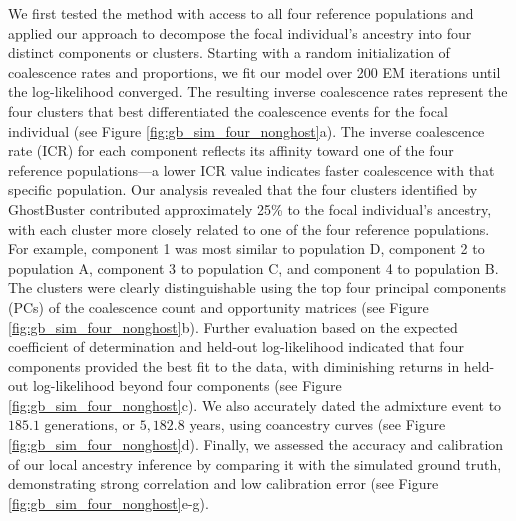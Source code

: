 We first tested the method with access to all four reference populations and applied our approach to decompose the focal individual's ancestry into four distinct components or clusters. Starting with a random initialization of coalescence rates and proportions, we fit our model over 200 EM iterations until the log-likelihood converged. The resulting inverse coalescence rates represent the four clusters that best differentiated the coalescence events for the focal individual (see Figure \ref{fig:gb_sim_four_nonghost}a). The inverse coalescence rate (ICR) for each component reflects its affinity toward one of the four reference populations—a lower ICR value indicates faster coalescence with that specific population. Our analysis revealed that the four clusters identified by GhostBuster contributed approximately 25\% to the focal individual's ancestry, with each cluster more closely related to one of the four reference populations. For example, component 1 was most similar to population D, component 2 to population A, component 3 to population C, and component 4 to population B. The clusters were clearly distinguishable using the top four principal components (PCs) of the coalescence count and opportunity matrices (see Figure \ref{fig:gb_sim_four_nonghost}b). Further evaluation based on the expected coefficient of determination and held-out log-likelihood indicated that four components provided the best fit to the data, with diminishing returns in held-out log-likelihood beyond four components (see Figure \ref{fig:gb_sim_four_nonghost}c). We also accurately dated the admixture event to $185.1$ generations, or $5{,}182.8$ years, using coancestry curves (see Figure \ref{fig:gb_sim_four_nonghost}d). Finally, we assessed the accuracy and calibration of our local ancestry inference by comparing it with the simulated ground truth, demonstrating strong correlation and low calibration error (see Figure \ref{fig:gb_sim_four_nonghost}e-g).

